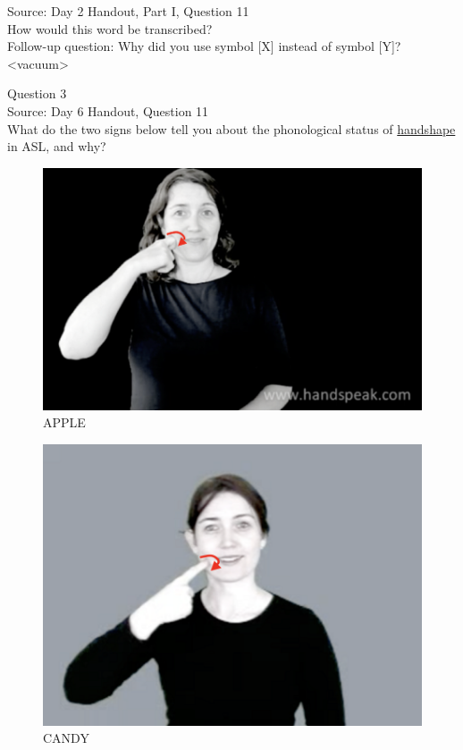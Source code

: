 \documentclass[12pt]{article}
\begin{document}
Source: Day 2 Handout, Part I, Question 11\\

How would this word be transcribed?\\ Follow-up question: Why did you use symbol [X] instead of symbol [Y]?\\

<vacuum>


\newpage

{\large Question 3}\\

Source: Day 6 Handout, Question 11\\

What do the two signs below tell you about the phonological status of \underline{handshape} in ASL, and why?\\

\begin{figure}[H]
\includegraphics{../images/asl_apple.png}
\caption{APPLE}
\end{figure}
\begin{figure}[H]
\includegraphics{../images/asl_candy.png}
\caption{CANDY}
\end{figure}
\end{document}
